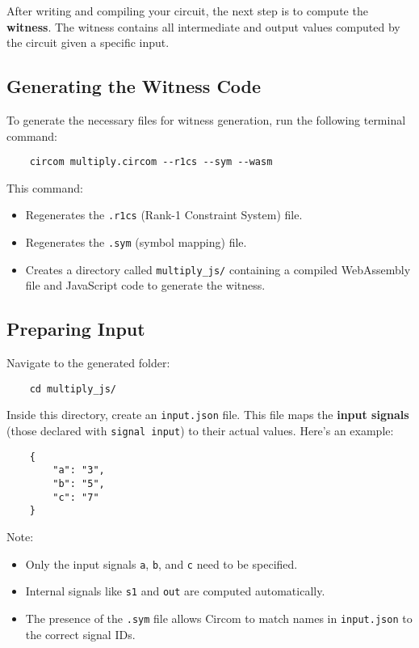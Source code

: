 \documentclass{article}
\begin{document}
After writing and compiling your circuit, the next step is to compute the \textbf{witness}. The witness contains all intermediate and output values computed by the circuit given a specific input.

\subsection*{Generating the Witness Code}

To generate the necessary files for witness generation, run the following terminal command:

\begin{verbatim}
	circom multiply.circom --r1cs --sym --wasm
\end{verbatim}

This command:
\begin{itemize}
	\item Regenerates the \texttt{.r1cs} (Rank-1 Constraint System) file.
	\item Regenerates the \texttt{.sym} (symbol mapping) file.
	\item Creates a directory called \texttt{multiply\_js/} containing a compiled WebAssembly file and JavaScript code to generate the witness.
\end{itemize}

\subsection*{Preparing Input}

Navigate to the generated folder:

\begin{verbatim}
	cd multiply_js/
\end{verbatim}
Inside this directory, create an \texttt{input.json} file. This file maps the \textbf{input signals} (those declared with \texttt{signal input}) to their actual values. Here's an example:


\begin{verbatim}
	{
		"a": "3",
		"b": "5",
		"c": "7"
	}
\end{verbatim}

Note:
\begin{itemize}
	\item Only the input signals \texttt{a}, \texttt{b}, and \texttt{c} need to be specified.
	\item Internal signals like \texttt{s1} and \texttt{out} are computed automatically.
	\item The presence of the \texttt{.sym} file allows Circom to match names in \texttt{input.json} to the correct signal IDs.
\end{itemize}
\end{document}
